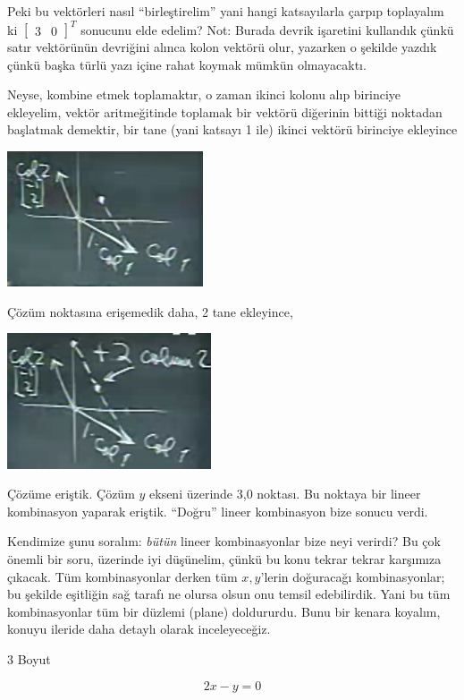 \documentclass[12pt,fleqn]{article}\usepackage{../../common}
\begin{document}
Peki bu vektörleri nasıl ``birleştirelim'' yani hangi katsayılarla çarpıp
toplayalım ki $\left[\begin{array}{rr}3 & 0\end{array}\right]^T$ sonucunu
elde edelim? Not: Burada devrik işaretini kullandık çünkü satır vektörünün
devriğini alınca kolon vektörü olur, yazarken o şekilde yazdık çünkü başka
türlü yazı içine rahat koymak mümkün olmayacaktı.

Neyse, kombine etmek toplamaktır, o zaman ikinci kolonu alıp birinciye
ekleyelim, vektör aritmeğitinde toplamak bir vektörü diğerinin bittiği
noktadan başlatmak demektir, bir tane (yani katsayı 1 ile) ikinci vektörü
birinciye ekleyince

\includegraphics[height=4cm]{1_04.png}

Çözüm noktasına erişemedik daha, 2 tane ekleyince,

\includegraphics[height=4cm]{1_05.png}

Çözüme eriştik. Çözüm $y$ ekseni üzerinde 3,0 noktası. Bu noktaya bir
lineer kombinasyon yaparak eriştik. ``Doğru'' lineer kombinasyon bize
sonucu verdi. 

Kendimize şunu soralım: {\em bütün} lineer kombinasyonlar bize neyi
verirdi? Bu çok önemli bir soru, üzerinde iyi düşünelim, çünkü bu konu
tekrar tekrar karşımıza çıkacak. Tüm kombinasyonlar derken tüm $x,y$'lerin
doğuracağı kombinasyonlar; bu şekilde eşitliğin sağ tarafı ne olursa olsun
onu temsil edebilirdik. Yani bu tüm kombinasyonlar tüm bir düzlemi (plane)
doldururdu. Bunu bir kenara koyalım, konuyu ileride daha detaylı olarak
inceleyeceğiz.

3 Boyut

$$  2x - y = 0  $$
\end{document}

